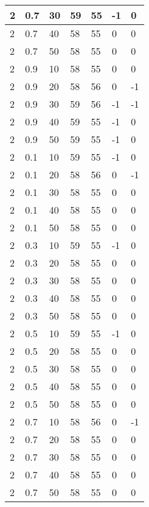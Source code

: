 \begin{longtable}{|l|l|l|l|l|l|l|}
		2     & 0.7 & 30   & 59 & 55 & -1  & 0   \\ \hline
		2     & 0.7 & 40   & 58 & 55 & 0   & 0   \\ \hline
		2     & 0.7 & 50   & 58 & 55 & 0   & 0   \\ \hline
		2     & 0.9 & 10   & 58 & 55 & 0   & 0   \\ \hline
		2     & 0.9 & 20   & 58 & 56 & 0   & -1  \\ \hline
		2     & 0.9 & 30   & 59 & 56 & -1  & -1  \\ \hline
		2     & 0.9 & 40   & 59 & 55 & -1  & 0   \\ \hline
		2     & 0.9 & 50   & 59 & 55 & -1  & 0   \\ \hline
		2     & 0.1 & 10   & 59 & 55 & -1  & 0   \\ \hline
		2     & 0.1 & 20   & 58 & 56 & 0   & -1  \\ \hline
		2     & 0.1 & 30   & 58 & 55 & 0   & 0   \\ \hline
		2     & 0.1 & 40   & 58 & 55 & 0   & 0   \\ \hline
		2     & 0.1 & 50   & 58 & 55 & 0   & 0   \\ \hline
		2     & 0.3 & 10   & 59 & 55 & -1  & 0   \\ \hline
		2     & 0.3 & 20   & 58 & 55 & 0   & 0   \\ \hline
		2     & 0.3 & 30   & 58 & 55 & 0   & 0   \\ \hline
		2     & 0.3 & 40   & 58 & 55 & 0   & 0   \\ \hline
		2     & 0.3 & 50   & 58 & 55 & 0   & 0   \\ \hline
		2     & 0.5 & 10   & 59 & 55 & -1  & 0   \\ \hline
		2     & 0.5 & 20   & 58 & 55 & 0   & 0   \\ \hline
		2     & 0.5 & 30   & 58 & 55 & 0   & 0   \\ \hline
		2     & 0.5 & 40   & 58 & 55 & 0   & 0   \\ \hline
		2     & 0.5 & 50   & 58 & 55 & 0   & 0   \\ \hline
		2     & 0.7 & 10   & 58 & 56 & 0   & -1  \\ \hline
		2     & 0.7 & 20   & 58 & 55 & 0   & 0   \\ \hline
		2     & 0.7 & 30   & 58 & 55 & 0   & 0   \\ \hline
		2     & 0.7 & 40   & 58 & 55 & 0   & 0   \\ \hline
		2     & 0.7 & 50   & 58 & 55 & 0   & 0   \\ \hline

\end{longtable}
